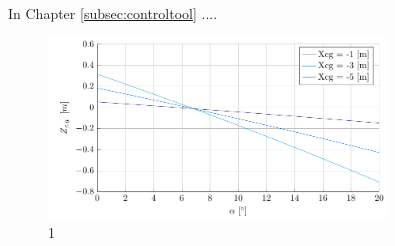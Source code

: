 
In Chapter \ref{subsec:controltool} ....

\begin{figure}[h]
	\centering
	\includegraphics[width=0.8\textwidth]{./Figure/control/moment}
	\caption{1}
	\label{fig:}
\end{figure}